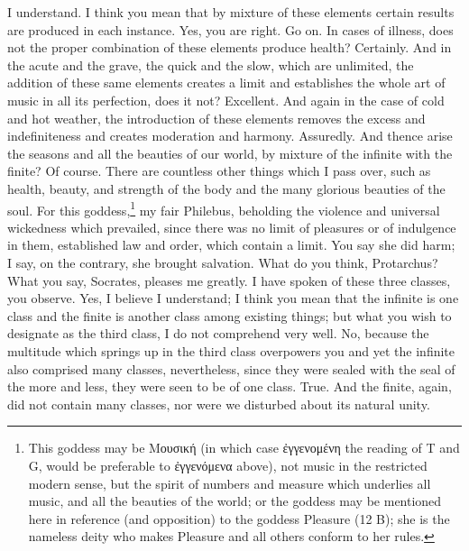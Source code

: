 \documentclass[letterpaper,12pt]{article}
\newcommand{\textgreek}[1]{\begingroup\fontencoding{LGR}\selectfont#1\endgroup}
\newcommand{\stephpag}[1]{\marginnote{\small\itshape\fontfamily{ppl}\selectfont #1}}
\begin{document}
\begin{drama}
\protarchusspeaks
I understand. I think you mean that by mixture of these elements certain results are produced in each instance.
\socratesspeaks
Yes, you are right.
\protarchusspeaks
Go on.
\socratesspeaks
In cases of illness, does not the proper combination of these elements produce health? \stephpag{26 a}
\protarchusspeaks
Certainly.
\socratesspeaks
And in the acute and the grave, the quick and the slow, which are unlimited, the addition of these same elements creates a limit and establishes the whole art of music in all its perfection, does it not?
\protarchusspeaks
Excellent.
\socratesspeaks
And again in the case of cold and hot weather, the introduction of these elements removes the excess and indefiniteness and creates moderation and harmony.
\protarchusspeaks
Assuredly.
\socratesspeaks
And thence arise the seasons and all the beauties of our world, \stephpag{b} by mixture of the infinite with the finite?
\protarchusspeaks
Of course.
\socratesspeaks
There are countless other things which I pass over, such as health, beauty, and strength of the body and the many glorious beauties of the soul. For this goddess,\footnote{This goddess may be \textgreek{Μουσική} (in which case \textgreek{ἐγγενομένη} the reading of T and G, would be preferable to \textgreek{ἐγγενόμενα} above), not music in the restricted modern sense, but the spirit of numbers and measure which underlies all music, and all the beauties of the world; or the goddess may be mentioned here in reference (and opposition) to the goddess Pleasure (12 B); she is the nameless deity who makes Pleasure and all others conform to her rules.} my fair Philebus, beholding the violence and universal wickedness which prevailed, since there was no limit of pleasures or of indulgence in them, established law and order, which contain a limit. You say she did harm; \stephpag{c} I say, on the contrary, she brought salvation. What do you think, Protarchus?
\protarchusspeaks
What you say, Socrates, pleases me greatly.
\socratesspeaks
I have spoken of these three classes, you observe.
\protarchusspeaks
Yes, I believe I understand; I think you mean that the infinite is one class and the finite is another class among existing things; but what you wish to designate as the third class, I do not comprehend very well.
\socratesspeaks
No, because the multitude which springs up in the third class overpowers you and yet the infinite also comprised many classes, \stephpag{d} nevertheless, since they were sealed with the seal of the more and less, they were seen to be of one class.
\protarchusspeaks
True.
\socratesspeaks
And the finite, again, did not contain many classes, nor were we disturbed about its natural unity.

\end{drama}
\end{document}
